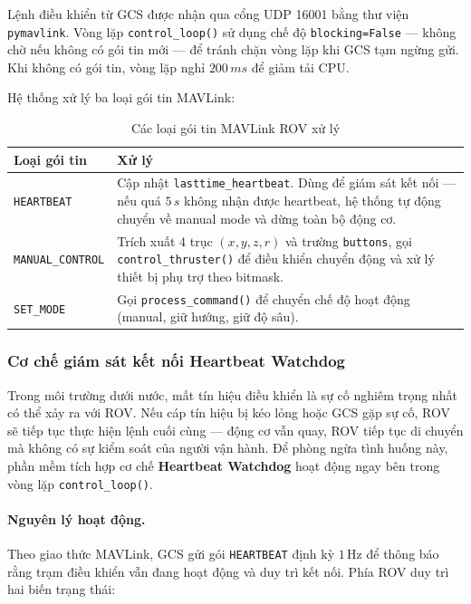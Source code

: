 \documentclass[../DoAn.tex]{subfiles}
\begin{document}
Lệnh điều khiển từ GCS được nhận qua cổng UDP 16001 bằng thư viện
\texttt{pymavlink}. Vòng lặp \texttt{control\_loop()} sử dụng chế độ
\texttt{blocking=False} --- không chờ nếu không có gói tin mới --- để
tránh chặn vòng lặp khi GCS tạm ngừng gửi. Khi không có gói tin,
vòng lặp nghỉ $200\,ms$ để giảm tải CPU.

Hệ thống xử lý ba loại gói tin MAVLink:

\begin{table}[H]
\centering
\renewcommand{\arraystretch}{1.3}
\begin{tabular}{|l|p{8cm}|}
\hline
\textbf{Loại gói tin} & \textbf{Xử lý} \\
\hline
\texttt{HEARTBEAT} &
    Cập nhật \texttt{lasttime\_heartbeat}. Dùng để giám sát kết nối
    --- nếu quá $5\,s$ không nhận được heartbeat, hệ thống tự động
    chuyển về manual mode và dừng toàn bộ động cơ. \\
\hline
\texttt{MANUAL\_CONTROL} &
    Trích xuất 4 trục $(x, y, z, r)$ và trường \texttt{buttons},
    gọi \texttt{control\_thruster()} để điều khiển chuyển động và
    xử lý thiết bị phụ trợ theo bitmask. \\
\hline
\texttt{SET\_MODE} &
    Gọi \texttt{process\_command()} để chuyển chế độ hoạt động
    (manual, giữ hướng, giữ độ sâu). \\
\hline
\end{tabular}
\caption{Các loại gói tin MAVLink ROV xử lý}
\label{tab:mavlink_recv}
\end{table}
\subsubsection{Cơ chế giám sát kết nối Heartbeat Watchdog}
 
Trong môi trường dưới nước, mất tín hiệu điều khiển là sự cố
nghiêm trọng nhất có thể xảy ra với ROV. Nếu cáp tín hiệu bị kéo
lỏng hoặc GCS gặp sự cố, ROV sẽ tiếp tục thực hiện lệnh cuối cùng
--- động cơ vẫn quay, ROV tiếp tục di chuyển mà không có sự kiểm
soát của người vận hành. Để phòng ngừa tình huống này, phần mềm
tích hợp cơ chế \textbf{Heartbeat Watchdog} hoạt động ngay bên
trong vòng lặp \texttt{control\_loop()}.
 
\paragraph{Nguyên lý hoạt động.}
 
Theo giao thức MAVLink, GCS gửi gói \texttt{HEARTBEAT} định kỳ
$1\,\text{Hz}$ để thông báo rằng trạm điều khiển vẫn đang hoạt
động và duy trì kết nối. Phía ROV duy trì hai biến trạng thái:
 
\end{document}
